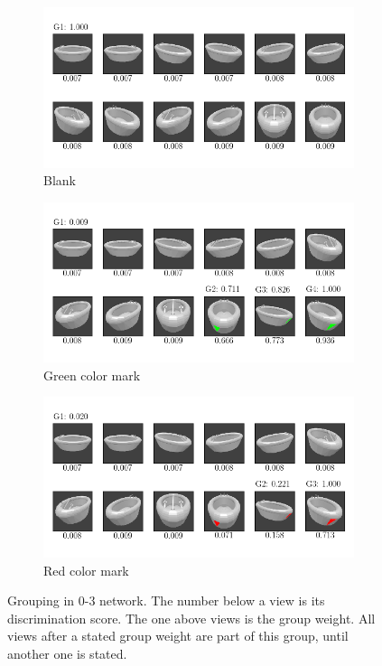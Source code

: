 \begin{figure}
	\centering
	\begin{subfigure}{\textwidth}
		\includegraphics[trim=10 20 10 20, clip]{images/mn-sl-0-3-20/bathtub_0107_0_grouping.png}
		\caption{Blank}
		\label{fig:grouping-0-3-blank}
	\end{subfigure}
	\begin{subfigure}{\textwidth}
		\includegraphics[trim=10 20 10 20, clip]{images/mn-sl-0-3-20/bathtub_0107_1_grouping.png}
		\caption{Green color mark}
		\label{fig:grouping-0-3-green}
	\end{subfigure}
	\begin{subfigure}{\textwidth}
		\includegraphics[trim=10 20 10 20, clip]{images/mn-sl-0-3-20/bathtub_0107_2_grouping.png}
		\caption{Red color mark}
		\label{fig:grouping-0-3-red}
	\end{subfigure}
	\caption[Grouping in 0-3 network]{Grouping in 0-3 network. The number below a view is its discrimination score. The one above views is the group weight. All views after a stated group weight are part of this group, until another one is stated.}
	\label{fig:grouping-0-3}
\end{figure}

